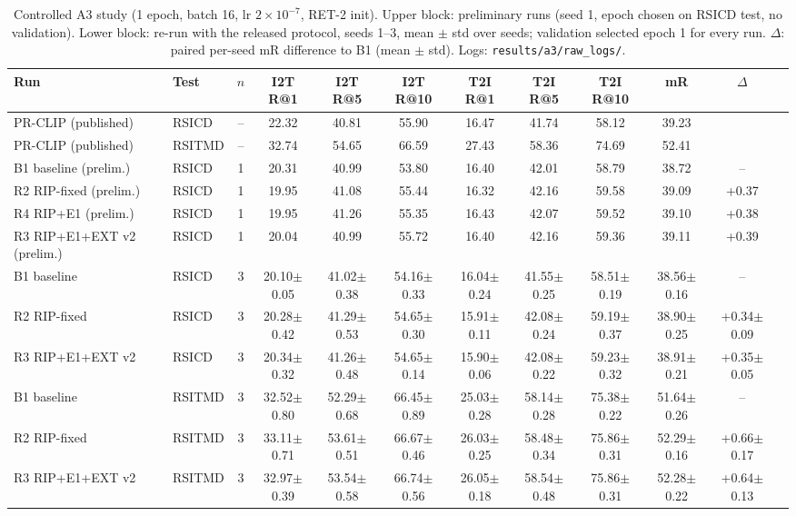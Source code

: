 \documentclass[conference]{IEEEtran}
\begin{document}
\begin{table}[t]
\centering
\caption{Controlled A3 study (1 epoch, batch 16, lr $2\times10^{-7}$, RET-2 init). Upper block: preliminary runs (seed 1, epoch chosen on RSICD test, no validation). Lower block: re-run with the released protocol, seeds 1--3, mean $\pm$ std over seeds; validation selected epoch 1 for every run. $\Delta$: paired per-seed mR difference to B1 (mean $\pm$ std). Logs: \texttt{results/a3/raw\_logs/}.}
\label{tab:a3}
\scriptsize
\setlength{\tabcolsep}{3.2pt}
\begin{tabular}{@{}llcccccccccc@{}}
\toprule
Run & Test & $n$ & I2T R@1 & I2T R@5 & I2T R@10 & T2I R@1 & T2I R@5 & T2I R@10 & mR & $\Delta$ \\
\midrule
PR-CLIP (published) & RSICD & -- & 22.32 & 40.81 & 55.90 & 16.47 & 41.74 & 58.12 & 39.23 & \\
PR-CLIP (published) & RSITMD & -- & 32.74 & 54.65 & 66.59 & 27.43 & 58.36 & 74.69 & 52.41 & \\
\midrule
B1 baseline (prelim.) & RSICD & 1 & 20.31 & 40.99 & 53.80 & 16.40 & 42.01 & 58.79 & 38.72 & -- \\
R2 RIP-fixed (prelim.) & RSICD & 1 & 19.95 & 41.08 & 55.44 & 16.32 & 42.16 & 59.58 & 39.09 & +0.37 \\
R4 RIP+E1 (prelim.) & RSICD & 1 & 19.95 & 41.26 & 55.35 & 16.43 & 42.07 & 59.52 & 39.10 & +0.38 \\
R3 RIP+E1+EXT v2 (prelim.) & RSICD & 1 & 20.04 & 40.99 & 55.72 & 16.40 & 42.16 & 59.36 & 39.11 & +0.39 \\
\midrule
B1 baseline & RSICD & 3 & 20.10$\pm$0.05 & 41.02$\pm$0.38 & 54.16$\pm$0.33 & 16.04$\pm$0.24 & 41.55$\pm$0.25 & 58.51$\pm$0.19 & 38.56$\pm$0.16 & -- \\
R2 RIP-fixed & RSICD & 3 & 20.28$\pm$0.42 & 41.29$\pm$0.53 & 54.65$\pm$0.30 & 15.91$\pm$0.11 & 42.08$\pm$0.24 & 59.19$\pm$0.37 & 38.90$\pm$0.25 & +0.34$\pm$0.09 \\
R3 RIP+E1+EXT v2 & RSICD & 3 & 20.34$\pm$0.32 & 41.26$\pm$0.48 & 54.65$\pm$0.14 & 15.90$\pm$0.06 & 42.08$\pm$0.22 & 59.23$\pm$0.32 & 38.91$\pm$0.21 & +0.35$\pm$0.05 \\
\midrule
B1 baseline & RSITMD & 3 & 32.52$\pm$0.80 & 52.29$\pm$0.68 & 66.45$\pm$0.89 & 25.03$\pm$0.28 & 58.14$\pm$0.28 & 75.38$\pm$0.22 & 51.64$\pm$0.26 & -- \\
R2 RIP-fixed & RSITMD & 3 & 33.11$\pm$0.71 & 53.61$\pm$0.51 & 66.67$\pm$0.46 & 26.03$\pm$0.25 & 58.48$\pm$0.34 & 75.86$\pm$0.31 & 52.29$\pm$0.16 & +0.66$\pm$0.17 \\
R3 RIP+E1+EXT v2 & RSITMD & 3 & 32.97$\pm$0.39 & 53.54$\pm$0.58 & 66.74$\pm$0.56 & 26.05$\pm$0.18 & 58.54$\pm$0.48 & 75.86$\pm$0.31 & 52.28$\pm$0.22 & +0.64$\pm$0.13 \\
\bottomrule
\end{tabular}
\end{table}
\end{document}
